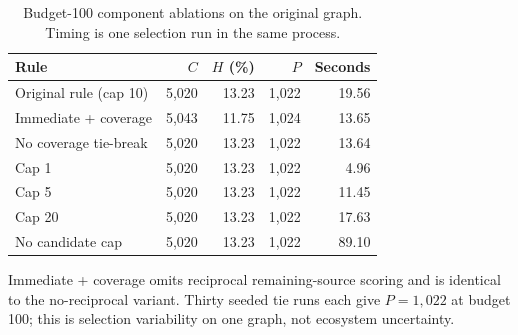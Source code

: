 \begin{table}[t]
\centering
\footnotesize
\caption{Budget-100 component ablations on the original graph. Timing is one selection run in the same process.}
\label{tab:revision_heuristic}
\begin{tabular}{lrrrr}
\toprule
Rule & $C$ & $H$ (\%) & $P$ & Seconds\\
\midrule
Original rule (cap 10) & 5,020 & 13.23 & 1,022 & 19.56\\
Immediate + coverage & 5,043 & 11.75 & 1,024 & 13.65\\
No coverage tie-break & 5,020 & 13.23 & 1,022 & 13.64\\
Cap 1 & 5,020 & 13.23 & 1,022 & 4.96\\
Cap 5 & 5,020 & 13.23 & 1,022 & 11.45\\
Cap 20 & 5,020 & 13.23 & 1,022 & 17.63\\
No candidate cap & 5,020 & 13.23 & 1,022 & 89.10\\
\bottomrule
\end{tabular}
\par\smallskip\begin{minipage}{0.98\textwidth}\footnotesize Immediate + coverage omits reciprocal remaining-source scoring and is identical to the no-reciprocal variant. Thirty seeded tie runs each give $P=1{,}022$ at budget 100; this is selection variability on one graph, not ecosystem uncertainty.\end{minipage}
\end{table}
